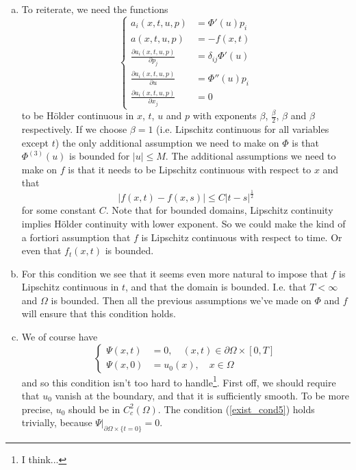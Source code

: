 \documentclass[11pt, a4paper]{article}
\begin{document}
\begin{appendices}
\begin{enumerate}[a)]
	\item To reiterate, we need the functions
	\begin{equation*}
		\begin{cases}
			a_i(x,t,u,p) &= \Phi'(u)p_i \\
			a(x,t,u,p) &= -f(x,t) \\
			\frac{\partial a_i(x,t,u,p)}{\partial p_j} &= \delta_{ij}\Phi'(u) \\
			\frac{\partial a_i(x,t,u,p)}{\partial u} &= \Phi''(u)p_i \\
			\frac{\partial a_i(x,t,u,p)}{\partial x_j} &= 0
		\end{cases}
	\end{equation*}
	to be Hölder continuous in $x$, $t$, $u$ and $p$ with exponents $\beta$, $\frac{\beta}{2}$, $\beta$ and $\beta$ respectively. If we choose $\beta = 1$ (i.e. Lipschitz continuous for all variables except $t$) the only additional assumption we need to make on $\Phi$ is that $\Phi^{(3)}(u)$ is bounded for $|u| \leq M$. The additional assumptions we need to make on $f$ is that it needs to be Lipschitz continuous with respect to $x$ and that
	\begin{equation*}
	|f(x,t) - f(x,s)| \leq C|t-s|^\frac{1}{2}
	\end{equation*}
	for some constant $C$. Note that for bounded domains, Lipschitz continuity implies Hölder continuity with lower exponent. So we could make the kind of a fortiori assumption that $f$ is Lipschitz continuous with respect to time. Or even that $f_t(x,t)$ is bounded.
	
	\item For this condition we see that it seems even more natural to impose that $f$ is Lipschitz continuous in $t$, and that the domain is bounded. I.e. that $T<\infty$ and $\Omega$ is bounded. Then all the previous assumptions we've made on $\Phi$ and $f$ will ensure that this condition holds.
	
	\item We of course have
	\begin{equation*}
		\begin{cases}
		\Psi(x,t) &= 0, \quad (x,t) \in \partial \Omega \times [0,T] \\
		\Psi(x,0) &= u_0(x), \quad x\in \Omega 
		\end{cases}
	\end{equation*}
	and so this condition isn't too hard to handle\footnote{I think...}. First off, we should require that $u_0$ vanish at the boundary, and that it is sufficiently smooth. To be more precise, $u_0$ should be in $C^2_c(\Omega)$. The condition (\ref{exist_cond5}) holds trivially, because  $\Psi\big|_{\partial \Omega \times \{t=0\}} = 0$.
	

\end{enumerate}
\end{appendices}
\end{document}
